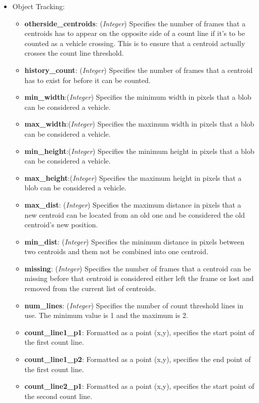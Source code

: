 \begin{itemize}
\item Object Tracking:
    \begin{itemize}
        \item \textbf{otherside\_centroids}: (\emph{Integer}) Specifies the number of frames that a centroids has to appear on the opposite side of a count line if it's to be counted as a vehicle crossing. This is to ensure that a centroid actually crosses the count line threshold.
        \item \textbf{history\_count}: (\emph{Integer}) Specifies the number of frames that a centroid has to exist for before it can be counted.
        \item\textbf{min\_width}:(\emph{Integer}) Specifies the minimum width in pixels that a blob can be considered a vehicle.
        \item\textbf{max\_width}:(\emph{Integer}) Specifies the maximum width in pixels that a blob can be considered a vehicle.
        \item\textbf{min\_height}:(\emph{Integer}) Specifies the minimum height in pixels that a blob can be considered a vehicle.
        \item\textbf{max\_height}:(\emph{Integer}) Specifies the maximum height in pixels that a blob can be considered a vehicle.
        \item\textbf{max\_dist}: (\emph{Integer}) Specifies the maximum distance in pixels that a new centroid can be located from an old one and be considered the old centroid's new position.
        \item\textbf{min\_dist}: (\emph{Integer}) Specifies the minimum distance in pixels between two centroids and them not be combined into one centroid. 
        \item\textbf{missing}: (\emph{Integer}) Specifies the number of frames that a centroid can be missing before that centroid is considered either left the frame or lost and removed from the current list of centroids.
        \item\textbf{num\_lines}: (\emph{Integer}) Specifies the number of count threshold lines in use. The minimum value is 1 and the maximum is 2. 
        \item\textbf{count\_line1\_p1}: Formatted as a point (x,y), specifies the start point of the first count line.
        \item\textbf{count\_line1\_p2}: Formatted as a point (x,y), specifies the end point of the first count line.
        \item\textbf{count\_line2\_p1}: Formatted as a point (x,y), specifies the start point of the second count line.

\end{itemize}
\end{itemize}
